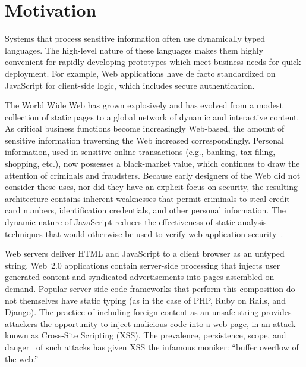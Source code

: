 \begin{comment}
\todo{categorize XSS?}
\begin{itemize}
    \item say that js handles sensitive info
    \item delineate injection
    \item categorize xss
    \item pound-include problem
    \item scare-monger prevalence as `buffer overflow'
    \item sandbox + same origin policy
    \item have to setup an attacker model?
\end{itemize}
\end{comment}

\chapter{Motivation}
\label{ch:motivation}

Systems that process sensitive information often use dynamically typed languages.
The high-level nature of these languages makes them highly convenient for rapidly developing prototypes which meet business needs for quick deployment.
For example, Web applications have de facto standardized on JavaScript for client-side logic, which includes secure authentication.

The World Wide Web has grown explosively and has evolved from a modest collection of static pages to a global network of dynamic and interactive content.
As critical business functions become increasingly Web-based, the amount of sensitive information traversing the Web increased correspondingly.
Personal information, used in sensitive online transactions (e.g., banking, tax filing, shopping, etc.), now possesses a black-market value, which continues to draw the attention of criminals and fraudsters.
Because early designers of the Web did not consider these uses, nor did they have an explicit focus on security, the resulting architecture contains inherent weaknesses that permit criminals to steal credit card numbers, identification credentials, and other personal information.
The dynamic nature of JavaScript reduces the effectiveness of static analysis techniques that would otherwise be used to verify web application security~\cite{robertson.vigna+09}.

Web servers deliver HTML and JavaScript to a client browser as an untyped string.
Web~2.0 applications contain server-side processing that injects user generated content and syndicated advertisements into pages assembled on demand.
Popular server-side code frameworks that perform this composition do not themselves have static typing (as in the case of PHP, Ruby on Rails, and Django).
The practice of including foreign content as an unsafe string provides attackers the opportunity to inject malicious code into a web page, in an attack known as Cross-Site Scripting (XSS).
The prevalence, persistence, scope, and danger~\cite{whitehat, cwe} of such attacks has given XSS the infamous moniker: ``buffer overflow of the web.''

